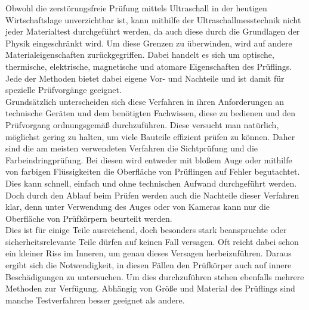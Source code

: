 \documentclass[reducespace,stylepage,semiarbeit]{spezidoc}
\begin{document}
Obwohl die zerstörungsfreie Prüfung mittels Ultraschall in der heutigen Wirtschaftslage unverzichtbar ist, kann mithilfe der Ultraschallmesstechnik nicht jeder Materialtest durchgeführt werden, da auch diese durch die Grundlagen der Physik eingeschränkt wird.
Um diese Grenzen zu überwinden, wird auf andere Materialeigenschaften zurückgegriffen.
Dabei handelt es sich um optische, thermische, elektrische, magnetische und atomare Eigenschaften des Prüflings. 
Jede der Methoden bietet dabei eigene Vor- und Nachteile und ist damit für spezielle Prüfvorgänge geeignet. \\
Grundsätzlich unterscheiden sich diese Verfahren in ihren Anforderungen an technische Geräten und dem benötigten Fachwissen, diese zu bedienen und den Prüfvorgang ordnungsgemäß durchzuführen. 
Diese versucht man natürlich, möglichst gering zu halten, um viele Bauteile effizient prüfen zu können.
Daher sind die am meisten verwendeten Verfahren die Sichtprüfung und die Farbeindringprüfung. 
Bei diesen wird entweder mit bloßem Auge oder mithilfe von farbigen Flüssigkeiten die Oberfläche von Prüflingen auf Fehler begutachtet. 
Dies kann schnell, einfach und ohne technischen Aufwand durchgeführt werden.
Doch durch den Ablauf beim Prüfen werden auch die Nachteile dieser Verfahren klar, denn unter Verwendung des Auges oder von Kameras kann nur die Oberfläche von Prüfkörpern beurteilt werden. \\
Dies ist für einige Teile ausreichend, doch besonders stark beanspruchte oder sicherheitsrelevante Teile dürfen auf keinen Fall versagen. 
Oft reicht dabei schon ein kleiner Riss im Inneren, um genau dieses Versagen herbeizuführen. 
Daraus ergibt sich die Notwendigkeit, in diesen Fällen den Prüfkörper auch auf innere Beschädigungen zu untersuchen.
Um dies durchzuführen stehen ebenfalls mehrere Methoden zur Verfügung.
Abhängig von Größe und Material des Prüflings sind manche Testverfahren besser geeignet als andere. 
\end{document}
